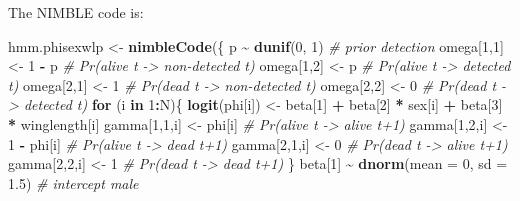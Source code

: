 \documentclass[
  12pt,
]{krantz}
\newenvironment{Shaded}{\begin{snugshade}}{\end{snugshade}}
\newcommand{\AttributeTok}[1]{\textcolor[rgb]{0.13,0.29,0.53}{#1}}
\newcommand{\CommentTok}[1]{\textcolor[rgb]{0.56,0.35,0.01}{\textit{#1}}}
\newcommand{\ControlFlowTok}[1]{\textcolor[rgb]{0.13,0.29,0.53}{\textbf{#1}}}
\newcommand{\DecValTok}[1]{\textcolor[rgb]{0.00,0.00,0.81}{#1}}
\newcommand{\FloatTok}[1]{\textcolor[rgb]{0.00,0.00,0.81}{#1}}
\newcommand{\FunctionTok}[1]{\textcolor[rgb]{0.13,0.29,0.53}{\textbf{#1}}}
\newcommand{\NormalTok}[1]{#1}
\newcommand{\OtherTok}[1]{\textcolor[rgb]{0.56,0.35,0.01}{#1}}
\newcommand{\SpecialCharTok}[1]{\textcolor[rgb]{0.81,0.36,0.00}{\textbf{#1}}}
\begin{document}
The NIMBLE code is:

\begin{Shaded}
\begin{Highlighting}[]
\NormalTok{hmm.phisexwlp }\OtherTok{\textless{}{-}} \FunctionTok{nimbleCode}\NormalTok{(\{}
\NormalTok{  p }\SpecialCharTok{\textasciitilde{}} \FunctionTok{dunif}\NormalTok{(}\DecValTok{0}\NormalTok{, }\DecValTok{1}\NormalTok{) }\CommentTok{\# prior detection}
\NormalTok{  omega[}\DecValTok{1}\NormalTok{,}\DecValTok{1}\NormalTok{] }\OtherTok{\textless{}{-}} \DecValTok{1} \SpecialCharTok{{-}}\NormalTok{ p    }\CommentTok{\# Pr(alive t {-}\textgreater{} non{-}detected t)}
\NormalTok{  omega[}\DecValTok{1}\NormalTok{,}\DecValTok{2}\NormalTok{] }\OtherTok{\textless{}{-}}\NormalTok{ p        }\CommentTok{\# Pr(alive t {-}\textgreater{} detected t)}
\NormalTok{  omega[}\DecValTok{2}\NormalTok{,}\DecValTok{1}\NormalTok{] }\OtherTok{\textless{}{-}} \DecValTok{1}        \CommentTok{\# Pr(dead t {-}\textgreater{} non{-}detected t)}
\NormalTok{  omega[}\DecValTok{2}\NormalTok{,}\DecValTok{2}\NormalTok{] }\OtherTok{\textless{}{-}} \DecValTok{0}        \CommentTok{\# Pr(dead t {-}\textgreater{} detected t)}
  \ControlFlowTok{for}\NormalTok{ (i }\ControlFlowTok{in} \DecValTok{1}\SpecialCharTok{:}\NormalTok{N)\{}
    \FunctionTok{logit}\NormalTok{(phi[i]) }\OtherTok{\textless{}{-}}\NormalTok{ beta[}\DecValTok{1}\NormalTok{] }\SpecialCharTok{+}\NormalTok{ beta[}\DecValTok{2}\NormalTok{] }\SpecialCharTok{*}\NormalTok{ sex[i] }\SpecialCharTok{+}\NormalTok{ beta[}\DecValTok{3}\NormalTok{] }\SpecialCharTok{*}\NormalTok{ winglength[i]}
\NormalTok{    gamma[}\DecValTok{1}\NormalTok{,}\DecValTok{1}\NormalTok{,i] }\OtherTok{\textless{}{-}}\NormalTok{ phi[i]      }\CommentTok{\# Pr(alive t {-}\textgreater{} alive t+1)}
\NormalTok{    gamma[}\DecValTok{1}\NormalTok{,}\DecValTok{2}\NormalTok{,i] }\OtherTok{\textless{}{-}} \DecValTok{1} \SpecialCharTok{{-}}\NormalTok{ phi[i]  }\CommentTok{\# Pr(alive t {-}\textgreater{} dead t+1)}
\NormalTok{    gamma[}\DecValTok{2}\NormalTok{,}\DecValTok{1}\NormalTok{,i] }\OtherTok{\textless{}{-}} \DecValTok{0}           \CommentTok{\# Pr(dead t {-}\textgreater{} alive t+1)}
\NormalTok{    gamma[}\DecValTok{2}\NormalTok{,}\DecValTok{2}\NormalTok{,i] }\OtherTok{\textless{}{-}} \DecValTok{1}           \CommentTok{\# Pr(dead t {-}\textgreater{} dead t+1)}
\NormalTok{  \}}
\NormalTok{  beta[}\DecValTok{1}\NormalTok{] }\SpecialCharTok{\textasciitilde{}} \FunctionTok{dnorm}\NormalTok{(}\AttributeTok{mean =} \DecValTok{0}\NormalTok{, }\AttributeTok{sd =} \FloatTok{1.5}\NormalTok{) }\CommentTok{\# intercept male}

\end{Highlighting}
\end{Shaded}
\end{document}
